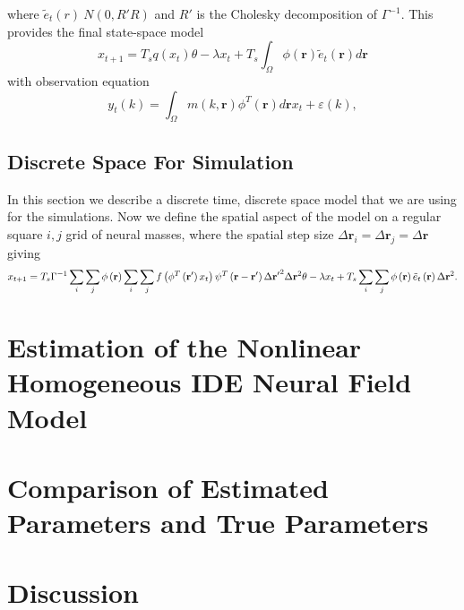 \documentclass[onecolumn,draftcls]{IEEEtran}
\begin{document}
where $\tilde{e}_t(r)~N(0,R'R)$ and $R'$ is the Cholesky decomposition of $\Gamma^{-1}$. This provides the final state-space model
\begin{equation}\label{AbbrevSSModel}
x_{t + 1} = T_sq(x_t)\theta -\lambda x_t + T_s\int_\Omega  {\phi ( \mathbf{r} )\tilde{e}_t( \mathbf{r} )d\mathbf{r}}
\end{equation}
with observation equation
\begin{equation}\label{ObservationEquation}
    y_t( k ) = \int_\Omega  m( k,\mathbf{r} )\phi^T( \mathbf{r} ) d\mathbf{r}x_t  + \varepsilon ( k ),
\end{equation}

\subsection{Discrete Space For Simulation}

In this section we describe a discrete time, discrete space model that we are using for the simulations. Now we define the spatial aspect of the model on a regular square $i,j$ grid of neural masses, where the spatial step size $\Delta \mathbf{r}_i = \Delta \mathbf{r}_j = \Delta \mathbf{r}$ giving
\begin{equation}\label{DiscreteSpaceModelij}
	x_{t+1} = T_s\Gamma ^{ - 1}\sum_i \sum_j  {\phi \left( \mathbf{r} \right)\sum_i\sum_j  {f\left( \phi^T \left( \mathbf{r'} \right) x_t \right)\psi^T \left( \mathbf{r} - \bf{r'} \right)\Delta\mathbf{r'}^2} \Delta\mathbf{r}^2} \theta - \lambda x_t + T_s\sum_i\sum_j  {\phi \left( {\bf{r}} \right)\tilde{e}_t\left( \bf{r} \right)\Delta\mathbf{r}^2}.
\end{equation}
\section{Estimation of the Nonlinear Homogeneous IDE Neural Field Model}


\section{Comparison of Estimated Parameters and True Parameters}

\section{Discussion}
\end{document}

